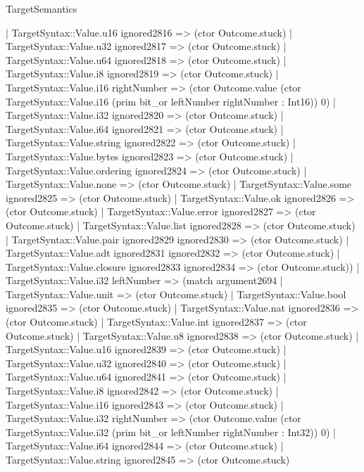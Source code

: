 \begin{lexlean}{TargetSemantics}
\begin{semanticmodule}
{              | TargetSyntax::Value.u16 ignored2816 => (ctor Outcome.stuck)
              | TargetSyntax::Value.u32 ignored2817 => (ctor Outcome.stuck)
              | TargetSyntax::Value.u64 ignored2818 => (ctor Outcome.stuck)
              | TargetSyntax::Value.i8 ignored2819 => (ctor Outcome.stuck)
              | TargetSyntax::Value.i16 rightNumber => (ctor Outcome.value (ctor TargetSyntax::Value.i16 (prim bit_or leftNumber rightNumber : Int16)) 0)
              | TargetSyntax::Value.i32 ignored2820 => (ctor Outcome.stuck)
              | TargetSyntax::Value.i64 ignored2821 => (ctor Outcome.stuck)
              | TargetSyntax::Value.string ignored2822 => (ctor Outcome.stuck)
              | TargetSyntax::Value.bytes ignored2823 => (ctor Outcome.stuck)
              | TargetSyntax::Value.ordering ignored2824 => (ctor Outcome.stuck)
              | TargetSyntax::Value.none => (ctor Outcome.stuck)
              | TargetSyntax::Value.some ignored2825 => (ctor Outcome.stuck)
              | TargetSyntax::Value.ok ignored2826 => (ctor Outcome.stuck)
              | TargetSyntax::Value.error ignored2827 => (ctor Outcome.stuck)
              | TargetSyntax::Value.list ignored2828 => (ctor Outcome.stuck)
              | TargetSyntax::Value.pair ignored2829 ignored2830 => (ctor Outcome.stuck)
              | TargetSyntax::Value.adt ignored2831 ignored2832 => (ctor Outcome.stuck)
              | TargetSyntax::Value.closure ignored2833 ignored2834 => (ctor Outcome.stuck))
            | TargetSyntax::Value.i32 leftNumber => (match argument2694
              | TargetSyntax::Value.unit => (ctor Outcome.stuck)
              | TargetSyntax::Value.bool ignored2835 => (ctor Outcome.stuck)
              | TargetSyntax::Value.nat ignored2836 => (ctor Outcome.stuck)
              | TargetSyntax::Value.int ignored2837 => (ctor Outcome.stuck)
              | TargetSyntax::Value.u8 ignored2838 => (ctor Outcome.stuck)
              | TargetSyntax::Value.u16 ignored2839 => (ctor Outcome.stuck)
              | TargetSyntax::Value.u32 ignored2840 => (ctor Outcome.stuck)
              | TargetSyntax::Value.u64 ignored2841 => (ctor Outcome.stuck)
              | TargetSyntax::Value.i8 ignored2842 => (ctor Outcome.stuck)
              | TargetSyntax::Value.i16 ignored2843 => (ctor Outcome.stuck)
              | TargetSyntax::Value.i32 rightNumber => (ctor Outcome.value (ctor TargetSyntax::Value.i32 (prim bit_or leftNumber rightNumber : Int32)) 0)
              | TargetSyntax::Value.i64 ignored2844 => (ctor Outcome.stuck)
              | TargetSyntax::Value.string ignored2845 => (ctor Outcome.stuck)
}
\end{semanticmodule}
\end{lexlean}
